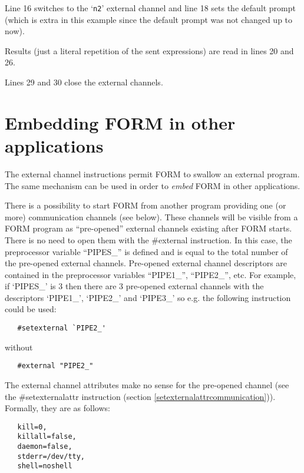 Line 16 switches to the `\verb|n2|' external channel and line 18 sets
the default prompt (which is extra in this example since the default
prompt was not changed up to now).

Results (just a literal repetition of the sent expressions) are read
in lines 20 and 26.

Lines 29 and 30 close the external channels.


\section{Embedding FORM in other applications}
\label{embeddingcommunication}

The external channel instructions permit FORM to swallow an external 
program. The same mechanism can be used in order to {\em 
embed} FORM in other applications.

There is a possibility to start FORM from another program providing
one (or more) communication channels (see below). These channels will be 
visible from a FORM program as
``pre-opened'' external channels 
existing after FORM starts. There is no need to open them with the 
\#external instruction.
In this case, the preprocessor variable ``PIPES\_'' is 
defined and is equal to the total number of the pre-opened external 
channels. Pre-opened external channel descriptors are contained in the 
preprocessor 
variables ``PIPE1\_'', ``PIPE2\_'', etc.
For example, if `PIPES\_' is 3 then there are 3 
pre-opened external channels with the descriptors `PIPE1\_',
`PIPE2\_' and `PIPE3\_' so e.g. the following instruction could
be used:
\begin{verbatim}
   #setexternal `PIPE2_'
\end{verbatim}
without 
\begin{verbatim}
   #external "PIPE2_"
\end{verbatim}

The external channel attributes make no sense for the pre-opened channel 
(see the \#setexternalattr instruction (section 
\ref{setexternalattrcommunication})).
Formally, they are as follows:
\begin{verbatim}
   kill=0,
   killall=false,
   daemon=false,
   stderr=/dev/tty,
   shell=noshell
\end{verbatim}

